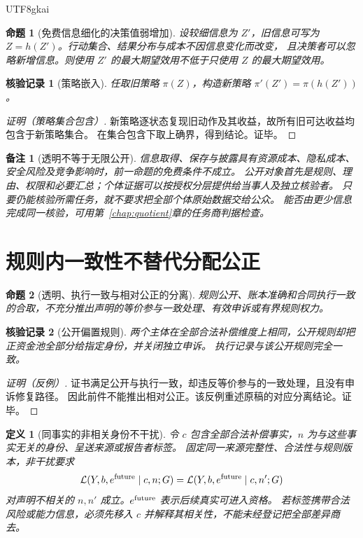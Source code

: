 \documentclass[12pt,a4paper,openany]{report}
\newtheorem{definition}{定义}[chapter]
\newtheorem{proposition}{命题}[chapter]
\newtheorem{remark}{备注}[chapter]
\newtheorem{Certificate}{核验记录}[chapter]
\newcommand{\Original}{原稿}
\begin{document}
\begin{CJK*}{UTF8}{gkai}
\begin{proposition}[免费信息细化的决策值弱增加]
\label{prop:information-value}
设较细信息为 $Z'$，旧信息可写为 $Z=h(Z')$。行动集合、结果分布与成本不因信息变化而改变，
且决策者可以忽略新增信息。则使用 $Z'$ 的最大期望效用不低于只使用 $Z$ 的最大期望效用。
\end{proposition}
\begin{Certificate}[策略嵌入]
任取旧策略 $\pi(Z)$，构造新策略 $\pi'(Z')=\pi(h(Z'))$。
\end{Certificate}
\begin{proof}[证明（策略集合包含）]
新策略逐状态复现旧动作及其收益，故所有旧可达收益均包含于新策略集合。
在集合包含下取上确界，得到结论。证毕。
\end{proof}

\begin{remark}[透明不等于无限公开]
信息取得、保存与披露具有资源成本、隐私成本、安全风险及竞争影响时，前一命题的免费条件不成立。
公开对象首先是规则、理由、权限和必要汇总；个体证据可以按授权分层提供给当事人及独立核验者。
只要仍能核验所需任务，就不要求把全部个体原始数据交给公众。
能否由更少信息完成同一核验，可用第~\ref{chap:quotient}章的任务商判据检查。
\end{remark}

\section{规则内一致性不替代分配公正}

\begin{proposition}[透明、执行一致与相对公正的分离]
\label{prop:fairness-separation}
规则公开、账本准确和合同执行一致的合取，不充分推出声明的等价参与一致处理、有效申诉或有界规则权力。
\end{proposition}
\begin{Certificate}[公开偏置规则]
两个主体在全部合法补偿维度上相同，公开规则却把正资金池全部分给指定身份，并关闭独立申诉。
执行记录与该公开规则完全一致。
\end{Certificate}
\begin{proof}[证明（反例）]
证书满足公开与执行一致，却违反等价参与的一致处理，且没有申诉修复路径。
因此前件不能推出相对公正。该反例重述\Original 的对应分离结论。证毕。
\end{proof}

\begin{definition}[同事实的非相关身份不干扰]
\label{def:nuisance}
令 $c$ 包含全部合法补偿事实，$n$ 为与这些事实无关的身份、呈送来源或报告者标签。
固定同一来源完整性、合法性与规则版本，非干扰要求
\[
 \mathcal L(Y,b,e^{\rm future}\mid c,n;G)
 =\mathcal L(Y,b,e^{\rm future}\mid c,n';G)
\]
对声明不相关的 $n,n'$ 成立。$e^{\rm future}$ 表示后续真实可进入资格。
若标签携带合法风险或能力信息，必须先移入 $c$ 并解释其相关性，不能未经登记把全部差异商去。
\end{definition}


\end{CJK*}
\end{document}
